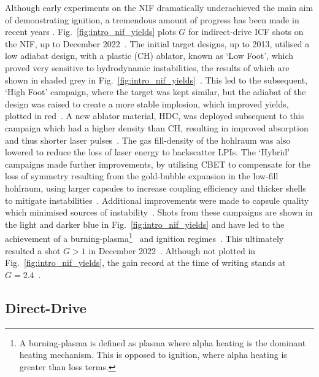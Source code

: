 Although early experiments on the \ac{NIF} dramatically underachieved the main aim of demonstrating ignition, a tremendous amount of progress has been made in recent years \cite{hurricane_physics_2023}.
Fig.~\ref{fig:intro_nif_yields} plots $G$ for indirect-drive \ac{ICF} shots on the \ac{NIF}, up to December 2022~\cite{abu-shawareb_achievement_2024}.
The initial target designs, up to 2013, utilised a low adiabat design, with a plastic (CH) ablator, known as `Low Foot', which proved very sensitive to hydrodynamic instabilities, the results of which are shown in shaded grey in Fig.~\ref{fig:intro_nif_yields}~\cite{lindl_review_2014}.
This led to the subsequent, `High Foot' campaign, where the target was kept similar, but the adiabat of the design was raised to create a more stable implosion, which improved yields, plotted in red~\cite{hurricane_highfoot_2014}.
A new ablator material, \ac{HDC}, was deployed subsequent to this campaign which had a higher density than CH, resulting in improved absorption and thus shorter laser pulses~\cite{mackinnon_highdensity_2014}.
The gas fill-density of the hohlraum was also lowered to reduce the loss of laser energy to backscatter \ac{LPIs}.
The `Hybrid' campaigns made further improvements, by utilising \ac{CBET} to compensate for the loss of symmetry resulting from the gold-bubble expansion in the low-fill hohlraum, using larger capsules to increase coupling efficiency and thicker shells to mitigate instabilities~\cite{zylstra_record_2021}.
Additional improvements were made to capsule quality which minimised sources of instability~\cite{kritcher_design_2024}.
Shots from these campaigns are shown in the light and darker blue in Fig.~\ref{fig:intro_nif_yields} and have led to the achievement of a burning-plasma\footnote{A burning-plasma is defined as plasma where alpha heating is the dominant heating mechanism. This is opposed to ignition, where alpha heating is greater than loss terms.}~\cite{zylstra_burning_2022,kritcher_design_2022} and ignition regimes~\cite{abu-shawareb_lawson_2022}.
This ultimately resulted a shot $G>1$ in December 2022~\cite{abu-shawareb_achievement_2024}.
Although not plotted in Fig.~\ref{fig:intro_nif_yields}, the gain record at the time of writing stands at $G=2.4$~\cite{_nif_}.

\subsection{Direct-Drive}%
\label{sec:intro_direct}

